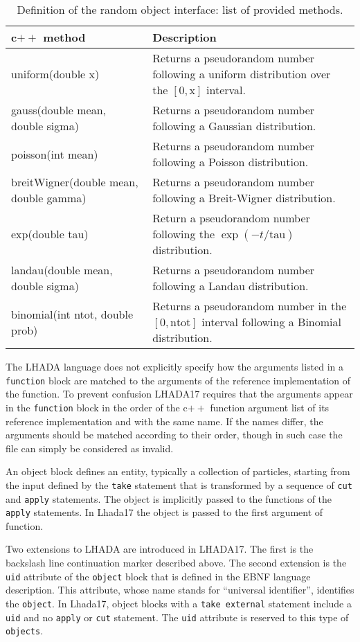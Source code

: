 \documentclass[11pt]{cernrep}
\begin{document}
 
\begin{table}
  \caption{Definition of the random object interface: list of provided methods. \label{tab:rand}}
  \begin{tabular}{l|p{20em}}
    c$++$ method & Description \\
    \hline
    uniform(double x)  & Returns a pseudorandom number following a uniform distribution over the $[0, \text{x}]$ interval.\\
    gauss(double mean, double sigma)    & Returns a pseudorandom number following a Gaussian distribution.\\
    poisson(int mean) & Returns a pseudorandom number following a Poisson distribution.\\
    breitWigner(double mean, double gamma) & Returns a pseudorandom number following a Breit-Wigner distribution. \\
    exp(double tau) & Return a pseudorandom number following the $\exp(-t/\text{tau})$ distribution. \\
    landau(double mean, double sigma) & Returns a pseudorandom number following a Landau distribution. \\
    binomial(int ntot, double prob) & Returns a pseudorandom number in the $[0, \text{ntot}]$ interval following a Binomial distribution.
  \end{tabular}
\end{table}


The {\sc LHADA} language does not explicitly specify how the arguments listed in a {\tt function} block are matched to the arguments of the reference implementation of the function. To prevent confusion {\sc LHADA17} requires that the arguments appear in the {\tt function} block in the order of the c$++$ function argument list of its reference implementation and with the same name. If the names differ, the arguments should be matched according to their order, though in such case the file can simply be considered as invalid.

An object block defines an entity, typically a collection of particles, starting from the input defined by the {\tt take} statement that is transformed by a sequence of {\tt cut} and {\tt apply} statements. The object is implicitly passed to the functions of the {\tt apply} statements. In {\sc Lhada17} the object is passed to the first argument of function.

Two extensions to {\sc LHADA} are introduced in {\sc LHADA17}. The first is the backslash line continuation marker described above. The second extension is the {\tt uid} attribute of the {\tt object} block that is defined in the EBNF language description. This attribute, whose name stands for ``universal identifier'', identifies the {\tt object}. In {\sc Lhada17}, object blocks with a {\tt take external} statement include a {\tt uid} and no {\tt apply} or {\tt cut} statement. The {\tt uid} attribute is reserved to this type of {\tt objects}.
\end{document}
